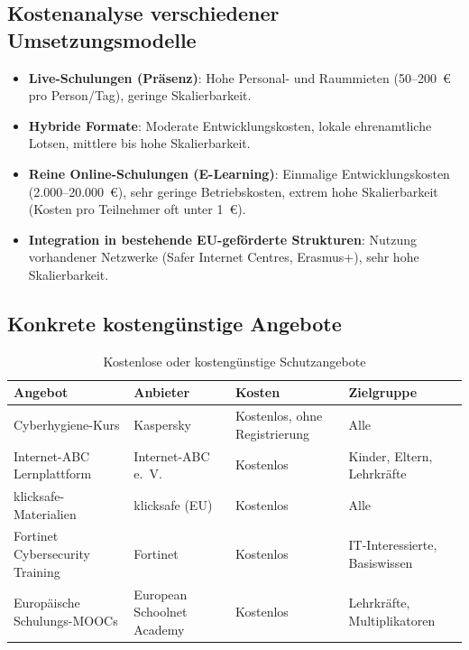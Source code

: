\documentclass[11pt,a4paper]{article}
\begin{document}
	\subsection{Kostenanalyse verschiedener Umsetzungsmodelle}
	\begin{itemize}
		\item \textbf{Live-Schulungen (Präsenz)}: Hohe Personal- und Raummieten (50--200~€ pro Person/Tag), geringe Skalierbarkeit.
		\item \textbf{Hybride Formate}: Moderate Entwicklungskosten, lokale ehrenamtliche Lotsen, mittlere bis hohe Skalierbarkeit.
		\item \textbf{Reine Online-Schulungen (E-Learning)}: Einmalige Entwicklungskosten (2.000--20.000~€), sehr geringe Betriebskosten, extrem hohe Skalierbarkeit (Kosten pro Teilnehmer oft unter 1~€).
		\item \textbf{Integration in bestehende EU-geförderte Strukturen}: Nutzung vorhandener Netzwerke (Safer Internet Centres, Erasmus+), sehr hohe Skalierbarkeit.
	\end{itemize}
	
	\subsection{Konkrete kostengünstige Angebote}
	\begin{table}[ht]
		\centering
		\caption{Kostenlose oder kostengünstige Schutzangebote}
		\begin{tabularx}{\linewidth}{@{}lXXX@{}}
			\toprule
			Angebot & Anbieter & Kosten & Zielgruppe \\
			\midrule
			Cyberhygiene-Kurs & Kaspersky & Kostenlos, ohne Registrierung & Alle \\
			Internet-ABC Lernplattform & Internet-ABC e.~V. & Kostenlos & Kinder, Eltern, Lehrkräfte \\
			klicksafe-Materialien & klicksafe (EU) & Kostenlos & Alle \\
			Fortinet Cybersecurity Training & Fortinet & Kostenlos & IT-Interessierte, Basiswissen \\
			Europäische Schulungs-MOOCs & European Schoolnet Academy & Kostenlos & Lehrkräfte, Multiplikatoren \\
			\bottomrule
		\end{tabularx}
	\end{table}
	
\end{document}
